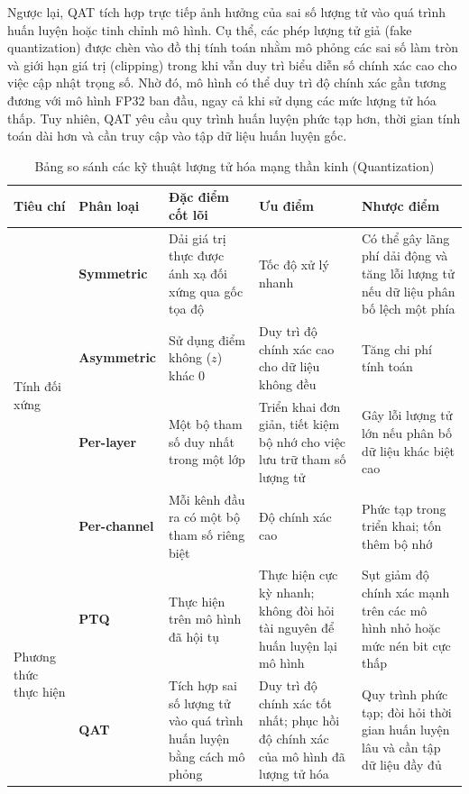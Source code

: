 Ngược lại, QAT tích hợp trực tiếp ảnh hưởng của sai số lượng tử vào quá trình huấn luyện hoặc tinh chỉnh mô hình. Cụ thể, các phép lượng tử giả (fake quantization) được chèn vào đồ thị tính toán nhằm mô phỏng các sai số làm tròn và giới hạn giá trị (clipping) trong khi vẫn duy trì biểu diễn số chính xác cao cho việc cập nhật trọng số. Nhờ đó, mô hình có thể duy trì độ chính xác gần tương đương với mô hình FP32 ban đầu, ngay cả khi sử dụng các mức lượng tử hóa thấp. Tuy nhiên, QAT yêu cầu quy trình huấn luyện phức tạp hơn, thời gian tính toán dài hơn và cần truy cập vào tập dữ liệu huấn luyện gốc.
\begin{table}[htbp]
\centering
\small
\begin{tabular}{|p{1.8cm} |p{2.2cm}|p{2.8cm} |p{2.8cm} |p{2.8cm}|}
\hline
\textbf{Tiêu chí} & \textbf{Phân loại} & \textbf{Đặc điểm cốt lõi} & \textbf{Ưu điểm} & \textbf{Nhược điểm} \\ 
\hline

\multirow{4}{=}{Tính đối xứng} & \textbf{Symmetric} & Dải giá trị thực được ánh xạ đối xứng qua gốc tọa độ & Tốc độ xử lý nhanh & Có thể gây lãng phí dải động và tăng lỗi lượng tử nếu dữ liệu phân bố lệch một phía \\ \cline{2-5}
 & \textbf{Asymmetric} & Sử dụng điểm không ($z$) khác 0 & Duy trì độ chính xác cao cho dữ liệu không đều & Tăng chi phí tính toán \\ 
\hline

\multirow{4}{=}{Độ mịn} & \textbf{Per-layer} & Một bộ tham số duy nhất trong một lớp & Triển khai đơn giản, tiết kiệm bộ nhớ cho việc lưu trữ tham số lượng tử & Gây lỗi lượng tử lớn nếu phân bố dữ liệu khác biệt cao \\ \cline{2-5}
 & \textbf{Per-channel} & Mỗi kênh đầu ra có một bộ tham số riêng biệt & Độ chính xác cao & Phức tạp trong triển khai; tốn thêm bộ nhớ \\ 
\hline

\multirow{4}{=}{Phương thức thực hiện} & \textbf{PTQ} & Thực hiện trên mô hình đã hội tụ & Thực hiện cực kỳ nhanh; không đòi hỏi tài nguyên để huấn luyện lại mô hình & Sụt giảm độ chính xác mạnh trên các mô hình nhỏ hoặc mức nén bit cực thấp \\ \cline{2-5}
 & \textbf{QAT} & Tích hợp sai số lượng tử vào quá trình huấn luyện bằng cách mô phỏng & Duy trì độ chính xác tốt nhất; phục hồi độ chính xác của mô hình đã lượng tử hóa & Quy trình phức tạp; đòi hỏi thời gian huấn luyện lâu và cần tập dữ liệu đầy đủ \\ 
\hline
\end{tabular}
\caption{Bảng so sánh các kỹ thuật lượng tử hóa mạng thần kinh  (Quantization)}
\label{tab:quantization_comparison}
\end{table}
